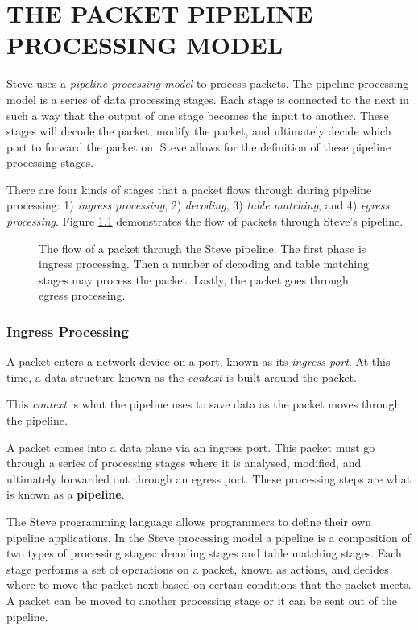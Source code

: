 \chapter{THE PACKET PIPELINE PROCESSING MODEL} \label{ch:pipeline_model}

Steve uses a \textit{pipeline processing model} to process packets. The pipeline processing model is a series of data processing stages. Each stage is connected to the next in such a way that the output of one stage becomes the input to another. These stages will decode the packet, modify the packet, and ultimately decide which port to forward the packet on. Steve allows for the definition of these pipeline processing stages.

There are four kinds of stages that a packet flows through during pipeline processing: 1) \textit{ingress processing}, 2) \textit{decoding}, 3) \textit{table matching}, and 4) \textit{egress processing}. Figure \ref{fg:pipeline_model} demonstrates the flow of packets through Steve's pipeline.

\begin{figure}
\caption{The flow of a packet through the Steve pipeline. The first phase is ingress processing. Then a number of decoding and table matching stages may process the packet. Lastly, the packet goes through egress processing.}
\label{fg:pipeline_model}
\end{figure}

\subsection{Ingress Processing} \label{ingress_stage}

A packet enters a network device on a port, known as its \textit{ingress port}. At this time, a data structure known as the \textit{context} is built around the packet. 

This \textit{context} is what the pipeline uses to save data as the packet moves through the pipeline. 

A packet comes into a data plane via an ingress port. This packet must go through a series of processing stages where it is analysed, modified, and ultimately forwarded out through an egress port. These processing steps are what is known as a \textbf{pipeline}.

The Steve programming language allows programmers to define their own pipeline applications. In the Steve processing model a pipeline is a composition of two types of processing stages: decoding stages and table matching stages. Each stage performs a set of operations on a packet, known as actions, and decides where to move the packet next based on certain conditions that the packet meets. A packet can be moved to another processing stage or it can be sent out of the pipeline.

